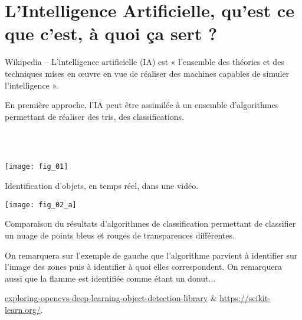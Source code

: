 \def\xxfigures{
}%

\iflivret

\else

\fi
\setlength{\columnseprule}{.1pt}

\vspace{2cm}
\pagestyle{fancy}
\thispagestyle{plain}








\section{L'Intelligence Artificielle, qu'est ce que c'est, à quoi ça sert ?}

\begin{defi}
Wikipedia -- L'intelligence artificielle (IA) est « l'ensemble des théories et des techniques mises en œuvre en vue de réaliser des machines capables de simuler l'intelligence ». 
\end{defi}

En première approche, l'IA peut être assimilée à un ensemble d'algorithmes permettant de réaliser des tris, des classifications.
\begin{exemple}~\\
\\
\vspace{-1cm}

\begin{multicols}{2}
\begin{center}
\texttt{[image: fig\_01]}
\end{center}
Identification d'objets, en temps réel, dans une vidéo.

\begin{center}
\texttt{[image: fig\_02\_a]}
\end{center}


Comparaison du résultats d'algorithmes de classification permettant de classifier un nuage de points bleus et rouges de transparences différentes.
\end{multicols}

On remarquera sur l'exemple de gauche que l'algorithme parvient à identifier sur l'image des zones puis à identifier à quoi elles correspondent. On remarquera aussi que la flamme est identifiée comme étant un donut...


\begin{flushright}
\footnotesize
\url{exploring-opencvs-deep-learning-object-detection-library} \&  \url{https://scikit-learn.org/}.
\normalsize

\end{flushright}
\end{exemple}



